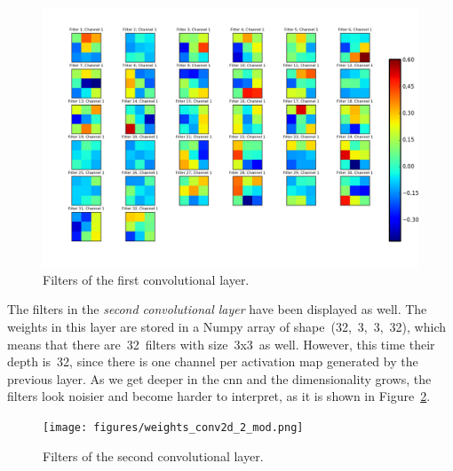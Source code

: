 \begin{figure}
	\centering
	\includegraphics[width=0.92\linewidth, keepaspectratio]{figures/weights_conv2d_1.png}
	\caption{Filters of the first convolutional layer.}
	\label{fig:filters}
\end{figure}

The filters in the \emph{second convolutional layer} have been displayed as well. The weights in this layer are stored in a Numpy array of shape~(32,~3,~3,~32), which means that there are~32~filters with size~3x3~as well. However, this time their depth is~32, since there is one channel per activation map generated by the previous layer. As we get deeper in the \gls{cnn} and the dimensionality grows, the filters look noisier and become harder to interpret, as it is shown in Figure~\ref{fig:filters2}.
\begin{figure}
	\centering
	\texttt{[image: figures/weights\_conv2d\_2\_mod.png]}
	\caption{Filters of the second convolutional layer.}
	\label{fig:filters2}
\end{figure}

